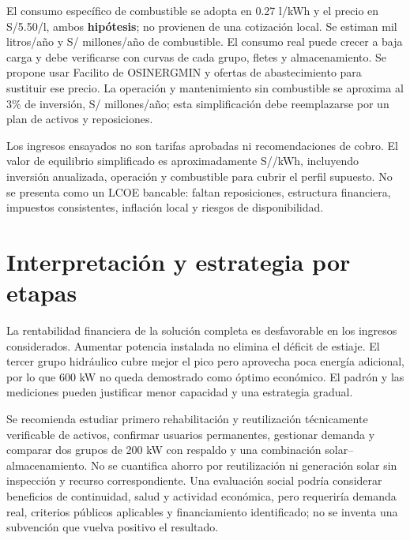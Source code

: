 El consumo específico de combustible se adopta en 0.27 l/kWh y el precio en S/5.50/l, ambos \textbf{hipótesis}; no provienen de una cotización local. Se estiman  mil litros/año y S/ millones/año de combustible. El consumo real puede crecer a baja carga y debe verificarse con curvas de cada grupo, fletes y almacenamiento. Se propone usar Facilito de OSINERGMIN y ofertas de abastecimiento para sustituir ese precio. La operación y mantenimiento sin combustible se aproxima al 3\% de inversión, S/ millones/año; esta simplificación debe reemplazarse por un plan de activos y reposiciones.

Los ingresos ensayados no son tarifas aprobadas ni recomendaciones de cobro. El valor de equilibrio simplificado es aproximadamente S//kWh, incluyendo inversión anualizada, operación y combustible para cubrir el perfil supuesto. No se presenta como un LCOE bancable: faltan reposiciones, estructura financiera, impuestos consistentes, inflación local y riesgos de disponibilidad.

\section{Interpretación y estrategia por etapas}
La rentabilidad financiera de la solución completa es desfavorable en los ingresos considerados. Aumentar potencia instalada no elimina el déficit de estiaje. El tercer grupo hidráulico cubre mejor el pico pero aprovecha poca energía adicional, por lo que 600 kW no queda demostrado como óptimo económico. El padrón y las mediciones pueden justificar menor capacidad y una estrategia gradual.

Se recomienda estudiar primero rehabilitación y reutilización técnicamente verificable de activos, confirmar usuarios permanentes, gestionar demanda y comparar dos grupos de 200 kW con respaldo y una combinación solar--almacenamiento. No se cuantifica ahorro por reutilización ni generación solar sin inspección y recurso correspondiente. Una evaluación social podría considerar beneficios de continuidad, salud y actividad económica, pero requeriría demanda real, criterios públicos aplicables y financiamiento identificado; no se inventa una subvención que vuelva positivo el resultado.

